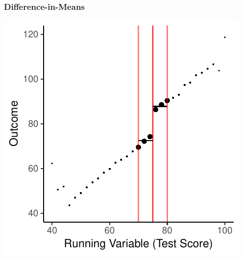 \documentclass[xcolor=x11names,compress]{beamer}\usepackage[]{graphicx}\usepackage[]{color}
\makeatletter
\def\maxwidth{ %
  \ifdim\Gin@nat@width>\linewidth
    \linewidth
  \else
    \Gin@nat@width
  \fi
}
\newenvironment{knitrout}{}{} %
\renewcommand{\(}{\begin{columns}}
\renewcommand{\)}{\end{columns}}
\newcommand{\<}[1]{\begin{column}{#1}}
\renewcommand{\>}{\end{column}}
\makeatother
\begin{document}
\begin{frame}
\frametitle{Difference-in-Means}
\begin{center}
\begin{knitrout}
\color{fgcolor}
\includegraphics[width=\maxwidth]{figure/chart3-1} 

\end{knitrout}
\end{center}
\end{frame}
\end{document}
